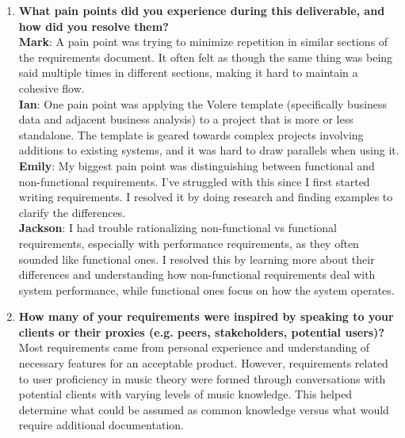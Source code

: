 \documentclass{article}
\begin{document}
\begin{enumerate}
  \item \textbf{What pain points did you experience during this deliverable, and how did you resolve them?} \\
  \textbf{Mark}: A pain point was trying to minimize repetition in similar sections of the requirements document. It often felt as though the same thing was being said multiple times in different sections, making it hard to maintain a cohesive flow. \\
  \textbf{Ian}: One pain point was applying the Volere template (specifically business data and adjacent business analysis) to a project that is more or less standalone. The template is geared towards complex projects involving additions to existing systems, and it was hard to draw parallels when using it. \\
  \textbf{Emily}: My biggest pain point was distinguishing between functional and non-functional requirements. I’ve struggled with this since I first started writing requirements. I resolved it by doing research and finding examples to clarify the differences. \\
  \textbf{Jackson}: I had trouble rationalizing non-functional vs functional requirements, especially with performance requirements, as they often sounded like functional ones. I resolved this by learning more about their differences and understanding how non-functional requirements deal with system performance, while functional ones focus on how the system operates. \\

  \item \textbf{How many of your requirements were inspired by speaking to your clients or their proxies (e.g. peers, stakeholders, potential users)?} \\
  Most requirements came from personal experience and understanding of necessary features for an acceptable product. However, requirements related to user proficiency in music theory were formed through conversations with potential clients with varying levels of music knowledge. This helped determine what could be assumed as common knowledge versus what would require additional documentation. \\


\end{enumerate}
\end{document}
